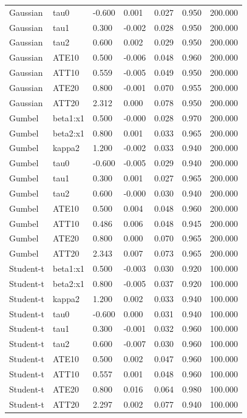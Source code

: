 \begin{table}[htbp]
\begin{tabular}{lllllll}
Gaussian & tau0 & -0.600 & 0.001 & 0.027 & 0.950 & 200.000 \\
Gaussian & tau1 & 0.300 & -0.002 & 0.028 & 0.950 & 200.000 \\
Gaussian & tau2 & 0.600 & 0.002 & 0.029 & 0.950 & 200.000 \\
Gaussian & ATE10 & 0.500 & -0.006 & 0.048 & 0.960 & 200.000 \\
Gaussian & ATT10 & 0.559 & -0.005 & 0.049 & 0.950 & 200.000 \\
Gaussian & ATE20 & 0.800 & -0.001 & 0.070 & 0.955 & 200.000 \\
Gaussian & ATT20 & 2.312 & 0.000 & 0.078 & 0.950 & 200.000 \\
Gumbel & beta1:x1 & 0.500 & -0.000 & 0.028 & 0.970 & 200.000 \\
Gumbel & beta2:x1 & 0.800 & 0.001 & 0.033 & 0.965 & 200.000 \\
Gumbel & kappa2 & 1.200 & -0.002 & 0.033 & 0.940 & 200.000 \\
Gumbel & tau0 & -0.600 & -0.005 & 0.029 & 0.940 & 200.000 \\
Gumbel & tau1 & 0.300 & 0.001 & 0.027 & 0.965 & 200.000 \\
Gumbel & tau2 & 0.600 & -0.000 & 0.030 & 0.940 & 200.000 \\
Gumbel & ATE10 & 0.500 & 0.004 & 0.048 & 0.960 & 200.000 \\
Gumbel & ATT10 & 0.486 & 0.006 & 0.048 & 0.945 & 200.000 \\
Gumbel & ATE20 & 0.800 & 0.000 & 0.070 & 0.965 & 200.000 \\
Gumbel & ATT20 & 2.343 & 0.007 & 0.073 & 0.965 & 200.000 \\
Student-t & beta1:x1 & 0.500 & -0.003 & 0.030 & 0.920 & 100.000 \\
Student-t & beta2:x1 & 0.800 & -0.005 & 0.037 & 0.920 & 100.000 \\
Student-t & kappa2 & 1.200 & 0.002 & 0.033 & 0.940 & 100.000 \\
Student-t & tau0 & -0.600 & 0.000 & 0.031 & 0.940 & 100.000 \\
Student-t & tau1 & 0.300 & -0.001 & 0.032 & 0.960 & 100.000 \\
Student-t & tau2 & 0.600 & -0.007 & 0.030 & 0.960 & 100.000 \\
Student-t & ATE10 & 0.500 & 0.002 & 0.047 & 0.960 & 100.000 \\
Student-t & ATT10 & 0.557 & 0.001 & 0.048 & 0.960 & 100.000 \\
Student-t & ATE20 & 0.800 & 0.016 & 0.064 & 0.980 & 100.000 \\
Student-t & ATT20 & 2.297 & 0.002 & 0.077 & 0.940 & 100.000 \\
\hline\end{tabular}\end{table}
